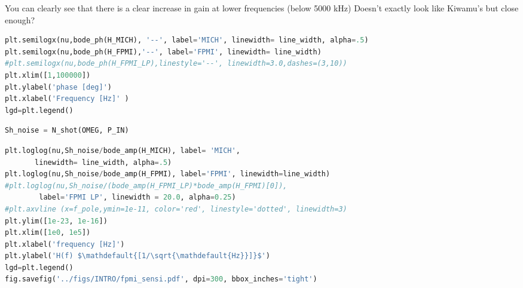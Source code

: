 You can clearly see that there is a clear increase in gain at lower
frequencies (below 5000 kHz) Doesn't exactly look like Kiwamu's but
close enough?

\begin{spacing}{1} \begin{lstlisting}[frame=single, language=Python]
plt.semilogx(nu,bode_ph(H_MICH), '--', label='MICH', linewidth= line_width, alpha=.5)
plt.semilogx(nu,bode_ph(H_FPMI),'--', label='FPMI', linewidth= line_width)
#plt.semilogx(nu,bode_ph(H_FPMI_LP),linestyle='--', linewidth=3.0,dashes=(3,10))
plt.xlim([1,100000])
plt.ylabel('phase [deg]')
plt.xlabel('Frequency [Hz]' )
lgd=plt.legend()
\end{lstlisting} \end{spacing}

\begin{spacing}{1} \begin{lstlisting}[frame=single, language=Python]
Sh_noise = N_shot(OMEG, P_IN)
\end{lstlisting} \end{spacing}

\begin{spacing}{1} \begin{lstlisting}[frame=single, language=Python]
plt.loglog(nu,Sh_noise/bode_amp(H_MICH), label= 'MICH', 
	   linewidth= line_width, alpha=.5)
plt.loglog(nu,Sh_noise/bode_amp(H_FPMI), label='FPMI', linewidth=line_width)
#plt.loglog(nu,Sh_noise/(bode_amp(H_FPMI_LP)*bode_amp(H_FPMI)[0]), 
	    label='FPMI LP', linewidth = 20.0, alpha=0.25)
#plt.axvline (x=f_pole,ymin=1e-11, color='red', linestyle='dotted', linewidth=3)
plt.ylim([1e-23, 1e-16])
plt.xlim([1e0, 1e5])
plt.xlabel('frequency [Hz]')
plt.ylabel('H(f) $\mathdefault{[1/\sqrt{\mathdefault{Hz}}]}$')
lgd=plt.legend()
fig.savefig('../figs/INTRO/fpmi_sensi.pdf', dpi=300, bbox_inches='tight')
\end{lstlisting} \end{spacing}


